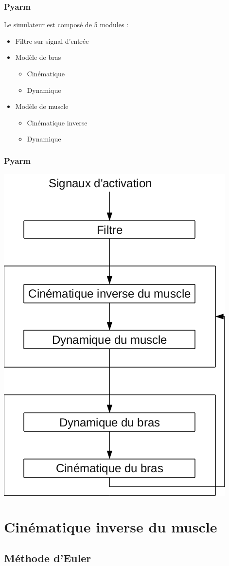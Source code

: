 \documentclass{beamer}
\begin{document}
\begin{frame}
\frametitle{Pyarm}
Le simulateur est composé de 5 modules :
\begin{itemize}
    \item Filtre sur signal d'entrée
    \item Modèle de bras
    \begin{itemize}
        \item Cinématique
        \item Dynamique
    \end{itemize}
    \item Modèle de muscle
    \begin{itemize}
        \item Cinématique inverse
        \item Dynamique
    \end{itemize}
\end{itemize}
\end{frame}

\begin{frame}
\frametitle{Pyarm}
\begin{center}
        \includegraphics[width=.40\linewidth]{fig/modules}
\end{center}
\end{frame}


\section{Cinématique inverse du muscle}

\subsection{Méthode d'Euler}
\end{document}
